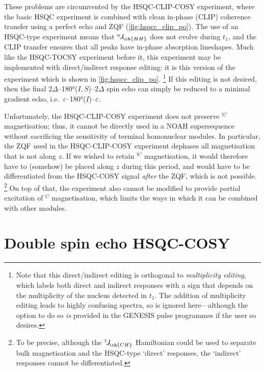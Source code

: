 \documentclass[a4paper,12pt]{article}
\newcommand{\carbon}{\ch{^{13}C}}
\newcommand{\magn}[1]{\ch{^1H}$^{#1}$}
\newcommand{\magnnot}[1]{\ch{^1H}$^{!#1}$}
\newcommand{\oneJ}[1]{{}^{1}\!J_{\!\ch{#1}}}
\newcommand{\nJ}[1]{{}^{n}\!J_{\!\ch{#1}}}
\begin{document}
\begin{refsection}
These problems are circumvented by the HSQC-CLIP-COSY experiment\autocite{Gyongyosi2018CPC,Gyongyosi2021AC}, where the basic HSQC experiment is combined with clean in-phase (CLIP) coherence transfer using a perfect echo\autocite{Aguilar2012CC,Parella2019MRC,Koos2016ACIE} and ZQF\autocite{Thrippleton2003ACIE} (\cref{fig:hsqcc_clip_po}).
The use of an HSQC-type experiment means that $\nJ{HH}$ does not evolve during $t_1$, and the CLIP transfer ensures that all peaks have in-phase absorption lineshapes.
Much like the HSQC-TOCSY experiment before it, this experiment may be implemented with direct/indirect response editing: it is this version of the experiment which is shown in \cref{fig:hsqcc_clip_po}.%
\footnote{Note that this direct/indirect editing is orthogonal to \textit{multiplicity editing}, which labels both direct and indirect responses with a sign that depends on the multiplicity of the \carbon{} nucleus detected in $t_1$. The addition of multiplicity editing leads to highly confusing spectra, so is ignored here---although the option to do so \textit{is} provided in the GENESIS pulse programmes if the user so desires.}
If this editing is not desired, then the final $2\Delta$--\ang{180}($I,S$)--$2\Delta$ spin echo can simply be reduced to a minimal gradient echo, i.e.\ $\varepsilon$--\ang{180}($I$)--$\varepsilon$.

Unfortunately, the HSQC-CLIP-COSY experiment does not preserve \magnnot{C} magnetisation; thus, it cannot be directly used in a NOAH supersequence without sacrificing the sensitivity of terminal homonuclear modules.
In particular, the ZQF used in the HSQC-CLIP-COSY experiment dephases all magnetisation that is not along $z$.
If we wished to retain \magnnot{C} magnetisation, it would therefore have to (somehow) be placed along $z$ during this period, and would have to be differentiated from the HSQC-COSY signal \textit{after} the ZQF, which is not possible.%
\footnote{To be precise, although the $\oneJ{CH}$ Hamiltonian could be used to separate bulk magnetisation and the HSQC-type `direct' responses, the `indirect' responses cannot be differentiated.}
On top of that, the experiment also cannot be modified to provide partial excitation of \magn{C} magnetisation, which limits the ways in which it can be combined with other \carbon{} modules.


\section{Double spin echo HSQC-COSY}


\end{refsection}
\end{document}
